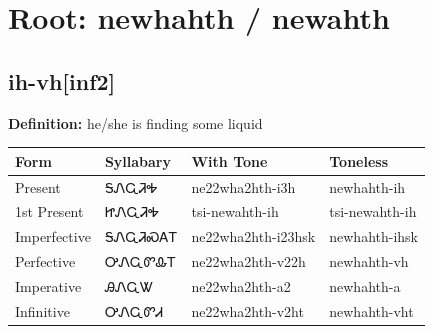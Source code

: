 \documentclass{article}%
\begin{document}
%
\normalsize%
\section*{Root: newhahth / newahth}%
\subsection*{ih-vh[inf2]}%
\textbf{Definition: }%
he/she is finding some liquid%
\\[0.5em]%
\begin{tabular}{|l|l|l|l|}%
\hline%
\textbf{Form}&\textbf{Syllabary}&\textbf{With Tone}&\textbf{Toneless}\\%
\hline%
Present&ᎦᏁᏩᏘᎭ&ne22wha2hth{-}i3h&newhahth{-}ih\\%
1st Present&ᏥᏁᏩᏘᎭ&tsi{-}newahth{-}ih&tsi{-}newahth{-}ih\\%
Imperfective&ᎦᏁᏩᏘᏍᎪᎢ&ne22wha2hth{-}i23hsk&newhahth{-}ihsk\\%
Perfective&ᎤᏁᏩᏛᎲᎢ&ne22wha2hth{-}v22h&newhahth{-}vh\\%
Imperative&ᎯᏁᏩᏔ&ne22wha2hth{-}a2&newhahth{-}a\\%
Infinitive&ᎤᏁᏩᏛᏗ&ne22wha2hth{-}v2ht&newhahth{-}vht\\%
\hline%
\end{tabular}%
\\[1em]%
\end{document}
